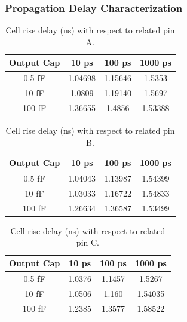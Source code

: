\documentclass[12pt]{article}
\begin{document}
\subsubsection{Propagation Delay Characterization}


\begin{table}[H]
	\centering
	\begin{tabular}{|c|c|c|c|}
		\hline
		Output Cap & 10 ps   & 100 ps  & 1000 ps \\
		\hline
		0.5 fF     & 1.04698 & 1.15646 & 1.5353  \\
		10 fF      & 1.0809  & 1.19140 & 1.5697  \\
		100 fF     & 1.36655 & 1.4856  & 1.53388 \\
		\hline
	\end{tabular}
	\caption{Cell rise delay (ns) with respect to related pin A.}
	\label{tab:rise_delay_A}
\end{table}

\begin{table}[H]
	\centering
	\begin{tabular}{|c|c|c|c|}
		\hline
		Output Cap & 10 ps   & 100 ps  & 1000 ps \\
		\hline
		0.5 fF     & 1.04043 & 1.13987 & 1.54399 \\
		10 fF      & 1.03033 & 1.16722 & 1.54833 \\
		100 fF     & 1.26634 & 1.36587 & 1.53499 \\
		\hline
	\end{tabular}
	\caption{Cell rise delay (ns) with respect to related pin B.}
	\label{tab:rise_delay_B}
\end{table}

\begin{table}[H]
	\centering
	\begin{tabular}{|c|c|c|c|}
		\hline
		Output Cap & 10 ps  & 100 ps & 1000 ps \\
		\hline
		0.5 fF     & 1.0376 & 1.1457 & 1.5267  \\
		10 fF      & 1.0506 & 1.160  & 1.54035 \\
		100 fF     & 1.2385 & 1.3577 & 1.58522 \\
		\hline
	\end{tabular}
	\caption{Cell rise delay (ns) with respect to related pin C.}
	\label{tab:rise_delay_C}
\end{table}
\end{document}
